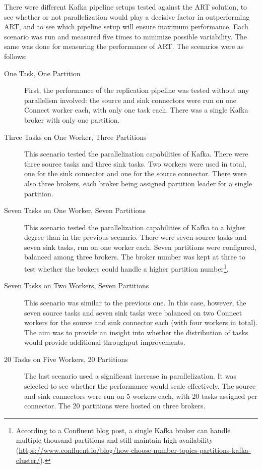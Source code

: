 There were different Kafka pipeline setups tested against the \ac{ART} solution, to see whether or not parallelization would play a decisive factor in outperforming \ac{ART}, and to see which pipeline setup will ensure maximum performance. Each scenario was run and measured five times to minimize possible variability. The same was done for measuring the performance of \ac{ART}. The scenarios were as follows:
\begin{description}
    \item [One Task, One Partition]
    First, the performance of the replication pipeline was tested without any parallelism involved: the source and sink connectors were run on one Connect worker each, with only one task each. There was a single Kafka broker with only one partition.

    \item[Three Tasks on One Worker, Three Partitions]
    This scenario tested the parallelization capabilities of Kafka. There were three source tasks and three sink tasks. Two workers were used in total, one for the sink connector and one for the source connector. There were also three brokers, each broker being assigned partition leader for a single partition.

    \item[Seven Tasks on One Worker, Seven Partitions]
    This scenario tested the parallelization capabilities of Kafka to a higher degree than in the previous scenario. There were seven source tasks and seven sink tasks, run on one worker each. Seven partitions were configured, balanced among three brokers. The broker number was kept at three to test whether the brokers could handle a higher partition number\footnote{According to a Confluent blog post, a single Kafka broker can handle multiple thousand partitions and still maintain high availability (\url{https://www.confluent.io/blog/how-choose-number-topics-partitions-kafka-cluster/}).}.

    \item[Seven Tasks on Two Workers, Seven Partitions]
    This scenario was similar to the previous one. In this case, however, the seven source tasks and seven sink tasks were balanced on two Connect workers for the source and sink connector each (with four workers in total). The aim was to provide an insight into whether the distribution of tasks would provide additional throughput improvements.
    
    \item[20 Tasks on Five Workers, 20 Partitions] The last scenario used a significant increase in parallelization. It was selected to see whether the performance would scale effectively. The source and sink connectors were run on 5 workers each, with 20 tasks assigned per connector. The 20 partitions were hosted on three brokers.
    
\end{description}

